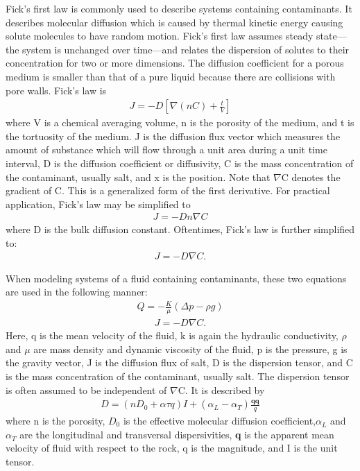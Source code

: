 \documentclass{article}
\begin{document}
Fick's first law is commonly used to describe systems containing contaminants.
It describes molecular diffusion which is caused by thermal kinetic energy causing solute molecules to have random motion. 
Fick's first law assumes steady state—the system is unchanged over time—and relates the dispersion of solutes to their concentration for two or more dimensions. 
The diffusion coefficient for a porous medium is smaller than that of a pure liquid because there are collisions with pore walls. 
Fick's law is 
    \begin{align}
        J = - D[\nabla(nC) + \frac{t}{V}] 
    \end{align} 
\noindent where V is a chemical averaging volume, n is the porosity of the medium, and t is the tortuosity of the medium. J is the diffusion flux vector which measures the amount of substance which will flow through a unit area during a unit time interval, D is the diffusion coefficient or diffusivity, C is the mass concentration of the contaminant, usually salt, and x is the position. 
Note that $\nabla$C denotes the gradient of C.
This is a generalized form of the first derivative. 
For practical application, Fick's law may be simplified to 
    \begin{align}
        J = - Dn\nabla C
    \end{align}
\noindent where D is the bulk diffusion constant. 
Oftentimes, Fick's law is further simplified to:
    \begin{align}
        J = - D\nabla C.
    \end{align}

When modeling systems of a fluid containing contaminants, these two equations are used in the following manner:
    \begin{align}
        Q = - \frac{K}{\mu}(\Delta p - \rho g)
    \end{align}
    \begin{align}
        J =- D\nabla C.
    \end{align}
\noindent Here, q is the mean velocity of the fluid, k is again the hydraulic conductivity, $\rho$ and $\mu$ are mass density and dynamic viscosity of the fluid, p is the pressure, g is the gravity vector, J is the diffusion flux of salt, D is the dispersion tensor, and C is the mass concentration of the contaminant, usually salt\cite{4}. 
The dispersion tensor is often assumed to be independent of $\nabla$C.
It is described by 
    \begin{align}
        D = (nD_{0} + \alpha \tau q)I + (\alpha^{}_{L} - \alpha^{}_{T})\frac{\textbf{qq}}{q}
    \end{align}
\noindent where n is the porosity, $D_0$ is the effective molecular diffusion coefficient,$\alpha^{}_{L}$ and$\alpha^{}_{T}$ are the longitudinal and transversal dispersivities, \textbf{q} is the apparent mean velocity of fluid with respect to the rock, q is the magnitude, and I is the unit tensor\cite{5}.
\end{document}
